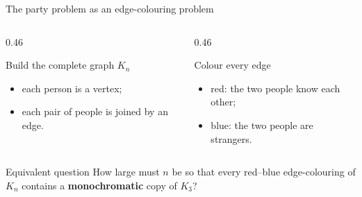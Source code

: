 \documentclass[aspectratio=169,11pt]{beamer}
\begin{document}
\begin{frame}{The party problem as an edge-colouring problem}
\large

\begin{columns}[T,onlytextwidth]
  \begin{column}{0.46\textwidth}
    \begin{block}{Build the complete graph $K_n$}
      \begin{itemize}
        \item each person is a vertex;
        \item each pair of people is joined by an edge.
      \end{itemize}
    \end{block}
  \end{column}
  \begin{column}{0.46\textwidth}
    \begin{block}{Colour every edge}
      \begin{itemize}
        \item \textcolor{RamRed}{red}: the two people know each other;
        \item \textcolor{RamBlue}{blue}: the two people are strangers.
      \end{itemize}
    \end{block}
  \end{column}
\end{columns}

\vspace{0.22cm}

\begin{alertblock}{Equivalent question}
  \centering
  How large must $n$ be so that every red--blue edge-colouring of $K_n$
  contains a \textbf{monochromatic} copy of $K_3$?
\end{alertblock}

\vspace{0.08cm}

\begin{center}
\end{center}
\end{frame}
\end{document}
